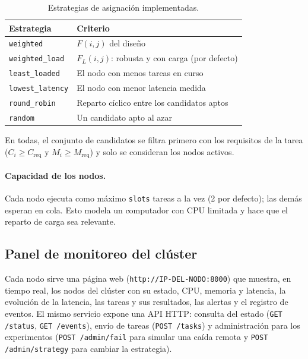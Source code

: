 \begin{table}[htbp]
\centering
\small
\begin{tabular}{|l|p{}|}
\hline
\textbf{Estrategia} & \textbf{Criterio} \\ \hline
\texttt{weighted} & $F(i,j)$ del diseño \\ \hline
\texttt{weighted\_load} & $F_L(i,j)$: robusta y con carga (por defecto) \\ \hline
\texttt{least\_loaded} & El nodo con menos tareas en curso \\ \hline
\texttt{lowest\_latency} & El nodo con menor latencia medida \\ \hline
\texttt{round\_robin} & Reparto cíclico entre los candidatos aptos \\ \hline
\texttt{random} & Un candidato apto al azar \\ \hline
\end{tabular}
\caption{Estrategias de asignación implementadas.}
\label{tab:estrategias-lista}
\end{table}

En todas, el conjunto de candidatos se filtra primero con los requisitos de la tarea
($C_i \geq C_{\mathrm{req}}$ y $M_i \geq M_{\mathrm{req}}$) y solo se consideran los nodos activos.

\paragraph{Capacidad de los nodos.}
Cada nodo ejecuta como máximo \texttt{slots} tareas a la vez (2 por defecto); las demás esperan en cola.
Esto modela un computador con CPU limitada y hace que el reparto de carga sea relevante.

\subsection{Panel de monitoreo del clúster}

Cada nodo sirve una página web (\texttt{http://IP-DEL-NODO:8000}) que muestra, en tiempo real, los
nodos del clúster con su estado, CPU, memoria y latencia, la evolución de la latencia, las tareas y sus
resultados, las alertas y el registro de eventos. El mismo servicio expone una API HTTP: consulta del
estado (\texttt{GET /status}, \texttt{GET /events}), envío de tareas (\texttt{POST /tasks}) y
administración para los experimentos (\texttt{POST /admin/fail} para simular una caída remota y
\texttt{POST /admin/strategy} para cambiar la estrategia).

